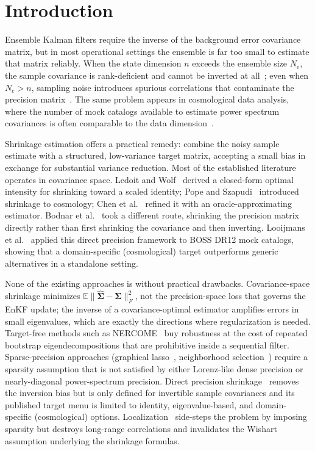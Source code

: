 \section{Introduction}
\label{sec:intro}

Ensemble Kalman filters require the inverse of the background error covariance matrix, but in most operational settings the ensemble is far too small to estimate that matrix reliably. When the state dimension $n$ exceeds the ensemble size $N_e$, the sample covariance is rank-deficient and cannot be inverted at all~\cite{houtekamer1998data}; even when $N_e > n$, sampling noise introduces spurious correlations that contaminate the precision matrix~\cite{anderson2001ensemble}. The same problem appears in cosmological data analysis, where the number of mock catalogs available to estimate power spectrum covariances is often comparable to the data dimension~\cite{hamilton2006measuring}.

Shrinkage estimation offers a practical remedy: combine the noisy sample estimate with a structured, low-variance target matrix, accepting a small bias in exchange for substantial variance reduction. Most of the established literature operates in covariance space. Ledoit and Wolf~\cite{ledoit2004well} derived a closed-form optimal intensity for shrinking toward a scaled identity; Pope and Szapudi~\cite{pope2008shrinkage} introduced shrinkage to cosmology; Chen et al.~\cite{chen2010shrinkage} refined it with an oracle-approximating estimator. Bodnar et al.~\cite{bodnar2016direct} took a different route, shrinking the precision matrix directly rather than first shrinking the covariance and then inverting. Looijmans et al.~\cite{looijmans2024comparison} applied this direct precision framework to BOSS DR12 mock catalogs, showing that a domain-specific (cosmological) target outperforms generic alternatives in a standalone setting.

None of the existing approaches is without practical drawbacks. Covariance-space shrinkage minimizes $\mathbb{E}\|\hat{\boldsymbol{\Sigma}} - \boldsymbol{\Sigma}\|_F^2$, not the precision-space loss that governs the EnKF update; the inverse of a covariance-optimal estimator amplifies errors in small eigenvalues, which are exactly the directions where regularization is needed. Target-free methods such as NERCOME~\cite{lam2016nonparametric} buy robustness at the cost of repeated bootstrap eigendecompositions that are prohibitive inside a sequential filter. Sparse-precision approaches (graphical lasso~\cite{friedman2008sparse}, neighborhood selection~\cite{meinshausen2006high}) require a sparsity assumption that is not satisfied by either Lorenz-like dense precision or nearly-diagonal power-spectrum precision. Direct precision shrinkage~\cite{bodnar2016direct} removes the inversion bias but is only defined for invertible sample covariances and its published target menu is limited to identity, eigenvalue-based, and domain-specific (cosmological) options. Localization~\cite{gaspari1999construction} side-steps the problem by imposing sparsity but destroys long-range correlations and invalidates the Wishart assumption underlying the shrinkage formulas.


